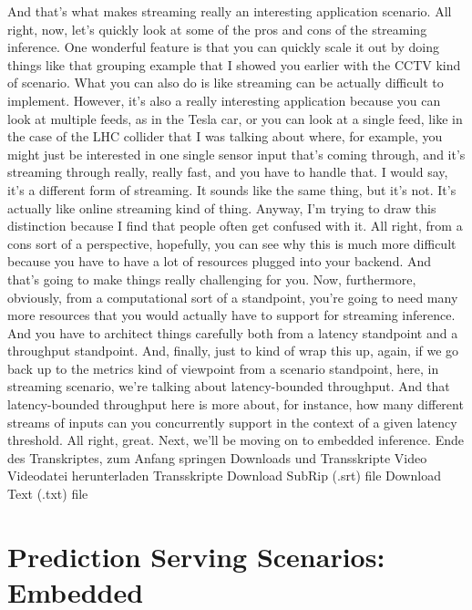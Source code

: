 {{{{{{{    And that's what makes streaming really an interesting application scenario.
    All right, now, let's quickly look at some of the pros
    and cons of the streaming inference.
    One wonderful feature is that you can quickly scale it out
    by doing things like that grouping example
    that I showed you earlier with the CCTV kind of scenario.
    What you can also do is like streaming can be actually difficult to implement.
    However, it's also a really interesting application
    because you can look at multiple feeds, as in the Tesla car,
    or you can look at a single feed, like in the case of the LHC collider
    that I was talking about where, for example,
    you might just be interested in one single sensor input that's
    coming through, and it's streaming through really, really fast,
    and you have to handle that.
    I would say, it's a different form of streaming.
    It sounds like the same thing, but it's not.
    It's actually like online streaming kind of thing.
    Anyway, I'm trying to draw this distinction because I find
    that people often get confused with it.
    All right, from a cons sort of a perspective,
    hopefully, you can see why this is much more
    difficult because you have to have a lot of resources plugged into your backend.
    And that's going to make things really challenging for you.
    Now, furthermore, obviously, from a computational sort of a standpoint,
    you're going to need many more resources that you would actually have
    to support for streaming inference.
    And you have to architect things carefully both
    from a latency standpoint and a throughput standpoint.
    And, finally, just to kind of wrap this up,
    again, if we go back up to the metrics kind of viewpoint
    from a scenario standpoint, here, in streaming scenario,
    we're talking about latency-bounded throughput.
    And that latency-bounded throughput here is more about,
    for instance, how many different streams of inputs
    can you concurrently support in the context of a given latency threshold.
    All right, great.
    Next, we'll be moving on to embedded inference.
    Ende des Transkriptes, zum Anfang springen
    Downloads und Transskripte
    Video
    Videodatei herunterladen
    Transskripte
    Download SubRip (.srt) file
    Download Text (.txt) file

\section{Prediction Serving Scenarios: Embedded}

}}}}}}}
